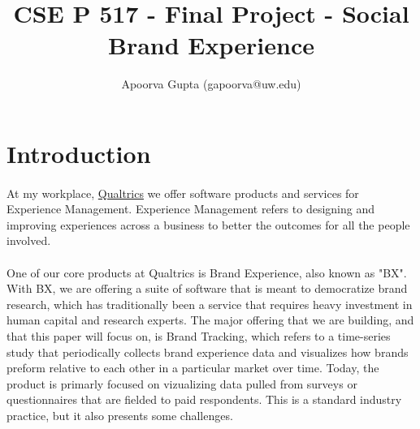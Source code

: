\documentclass{article}
\begin{document}
\title{CSE P 517 - Final Project - Social Brand Experience}
\author{ Apoorva Gupta (gapoorva@uw.edu)}

\maketitle{}

\section{Introduction}

\paragraph{} At my workplace, \href{http://www.qualtrics.com/brand-experience/}{Qualtrics} we offer software products and services for Experience Management. Experience Management refers to designing and improving experiences across a business to better the outcomes for all the people involved.

\paragraph{} One of our core products at Qualtrics is Brand Experience, also known as "BX". With BX, we are offering a suite of software that is meant to democratize brand research, which has traditionally been a service that requires heavy investment in human capital and research experts. The major offering that we are building, and that this paper will focus on, is Brand Tracking, which refers to a time-series study that periodically collects brand experience data and visualizes how brands preform relative to each other in a particular market over time. Today, the product is primarly focused on vizualizing data pulled from surveys or questionnaires that are fielded to paid respondents. This is a standard industry practice, but it also presents some challenges.
\end{document}
